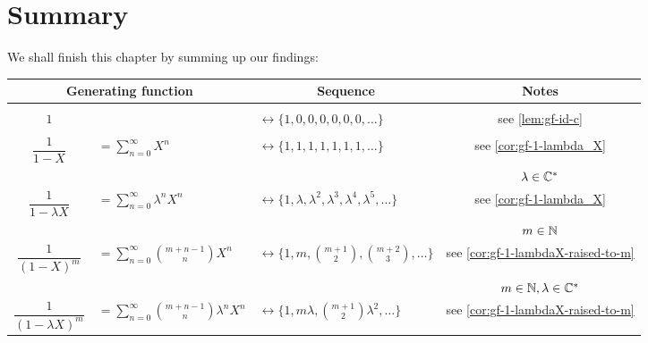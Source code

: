 \documentclass[a4paper, 12pt]{report}
\begin{document}
\section{Summary}\label{sec:gf-summary}
We shall finish this chapter by summing up our findings:
\begin{table}[h]
    \centering
    \begin{tabular}{c l l | c}
    \multicolumn{2}{c}{\textbf{Generating function}} & \multicolumn{1}{c}{\textbf{Sequence}} & \textbf{Notes}\\\hline
    
    &&&\\
    $1$ 
    & 
    & $\longleftrightarrow \{1, 0, 0, 0, 0, 0, 0, \dots\}$ 
    &see \cref{lem:gf-id-c}\\
    
    &&&\\
    $\dfrac{1}{1 - X}$ 
    & $= \sum_{n = 0}^\infty X^n$ 
    & $\longleftrightarrow \{1, 1, 1, 1, 1, 1, 1, \dots\}$ 
    &see \cref{cor:gf-1-lambda_X}\\
    
    &&&$\lambda \in \mathbb{C}^*$\\
    $\dfrac{1}{1 - \lambda X}$ 
    & $= \sum_{n = 0}^\infty \lambda^n X^n$ 
    & $\longleftrightarrow \{1, \lambda, \lambda^2, \lambda^3, \lambda^4, \lambda^5, \dots\}$ 
    &see \cref{cor:gf-1-lambda_X}\\
    
    
    &&&$m \in \mathbb{N}$\\
    $\dfrac{1}{(1 - X)^m}$
    & $= \sum_{n = 0}^{\infty} \binom{m + n - 1}{n} X^n$
    & $\longleftrightarrow \{1, m, \binom{m + 1}{2}, \binom{m + 2}{3}, \dots\}$
    & see \cref{cor:gf-1-lambdaX-raised-to-m}\\
    
    &&&$m \in \mathbb{N}, \lambda \in \mathbb{C}^*$\\
    $\dfrac{1}{(1 - \lambda X)^m}$
    & $= \sum_{n = 0}^{\infty} \binom{m + n - 1}{n} \lambda^n X^n$
    & $\longleftrightarrow \{1, m \lambda, \binom{m + 1}{2} \lambda^2, \dots\}$
    & see \cref{cor:gf-1-lambdaX-raised-to-m}
    
    \end{tabular}
    \label{tab:my_label}
\end{table}
\end{document}

